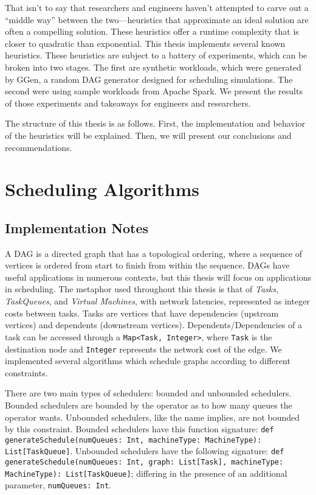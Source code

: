 \documentclass[11pt, oneside]{article}   	%
\begin{document}
That isn't to say that researchers and engineers haven't attempted to carve out a ``middle way'' between the two---heuristics that approximate an ideal solution are often a compelling solution. These heuristics offer a runtime complexity that is closer to quadratic than exponential. This thesis implements several known heuristics. These heuristics are subject to a battery of experiments, which can be broken into two stages. The first are synthetic workloads, which were generated by GGen, a random DAG generator designed for scheduling simulations. The second were using sample workloads from Apache Spark. We present the results of those experiments and takeaways for engineers and researchers.

The structure of this thesis is as follows. First, the implementation and behavior of the heuristics will be explained. Then, we will present our conclusions and recommendations.

\section{Scheduling Algorithms}

\subsection*{Implementation Notes}

A DAG is a directed graph that has a topological ordering, where a sequence of vertices is ordered from start to finish from within the sequence. DAGs have useful applications in numerous contexts, but this thesis will focus on applications in scheduling. The metaphor used throughout this thesis is that of \emph{Tasks}, \emph{TaskQueues}, and \emph{Virtual Machines}, with network latencies, represented as integer costs between tasks. Tasks are vertices that have dependencies (upstream vertices) and dependents (downstream vertices). Dependents/Dependencies of a task can be accessed through a \texttt{Map<Task, Integer>}, where \texttt{Task} is the destination node and \texttt{Integer} represents the network cost of the edge. We implemented several algorithms which schedule graphs according to different constraints.

There are two main types of schedulers: bounded and unbounded schedulers. Bounded schedulers are bounded by the operator as to how many queues the operator wants. Unbounded schedulers, like the name implies, are not bounded by this constraint. Bounded schedulers have this function signature: \texttt{def generateSchedule(numQueues: Int, machineType: MachineType): List[TaskQueue]}. Unbounded schedulers have the following signature: \texttt{def generateSchedule(numQueues: Int, graph: List[Task], machineType: MachineType): List[TaskQueue]}; differing in the presence of an additional parameter, \texttt{numQueues: Int}.
\end{document}
